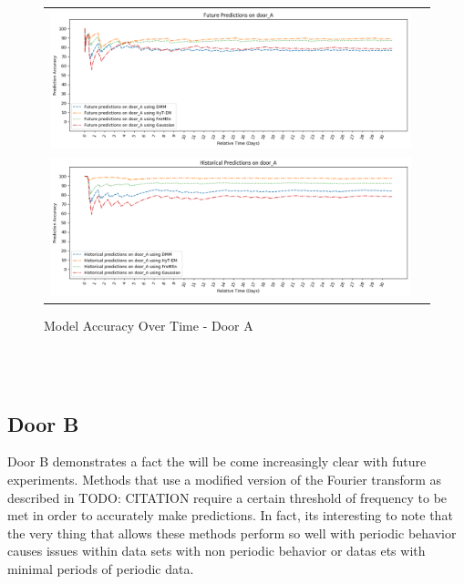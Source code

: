 \begin{center}
\begin{figure}[!Hp]
  \begin{tabular}{cc}
    {\includegraphics[width = 6in]{images/results/Future_Predictions_on_door_A.png}} \\
    {\includegraphics[width = 6in]{images/results/Historical_Predictions_on_door_A.png}} \\
  \end{tabular}
  \caption{Model Accuracy Over Time - Door A}
  \label{figure:accuracy_door_A}
\end{figure} \\ \\
\end{center}

\subsection { Door B }

Door B demonstrates a fact the will be come increasingly clear with future
experiments. Methods that use a modified version of the Fourier transform as
described in TODO: CITATION require a certain threshold of frequency to be met
in order to accurately make predictions. In fact, its interesting to note that the
very thing that allows these methods perform so well with periodic behavior
causes issues within data sets with non periodic behavior or datas ets with
minimal periods of periodic data. \\

